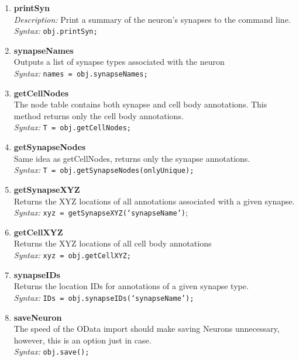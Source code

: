 \documentclass[12pt]{exam}
\begin{document}
\begin{enumerate}
		\item \textbf{printSyn}\\
		\textit{Description:} Print a summary of the neuron's synapses to the command line.\\
		\textit{Syntax:} \texttt{obj.printSyn;}
		\item \textbf{synapseNames}\\
		Outputs a list of synapse types associated with the neuron\\
		\textit{Syntax:} \texttt{names = obj.synapseNames;}
		\item \textbf{getCellNodes}\\
		The node table contains both synapse and cell body annotations. This method returns only the cell body annotations.\\
		\textit{Syntax:} \texttt{T = obj.getCellNodes;}
		\item \textbf{getSynapseNodes}\\
		Same idea as getCellNodes, returns only the synapse annotations.\\
		\textit{Syntax:} \texttt{T = obj.getSynapseNodes(onlyUnique);}
		\item \textbf{getSynapseXYZ}\\
		Returns the XYZ locations of all annotations associated with a given synapse.\\
		\textit{Syntax:} \texttt{xyz = getSynapseXYZ(`synapseName')};
		\item \textbf{getCellXYZ}\\
		Returns the XYZ locations of all cell body annotations\\
		\textit{Syntax:} \texttt{xyz = obj.getCellXYZ;}
		\item \textbf{synapseIDs}\\
		Returns the location IDs for annotations of a given synapse type.\\
		\textit{Syntax:} \texttt{IDs = obj.synapseIDs(`synapseName');}
		\item \textbf{saveNeuron}\\
		The speed of the OData import should make saving Neurons unnecessary, however, this is an option just in case.\\
		\textit{Syntax:} \texttt{obj.save();}
	\end{enumerate}
\end{document}

